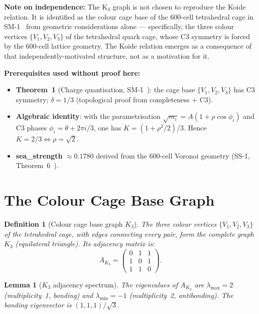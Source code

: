 \documentclass[11pt]{article}
\newtheorem{lemma}[theorem]{Lemma}
\newtheorem{definition}{Definition}[section]
\begin{document}
\textbf{Note on independence:} The K$_3$ graph is not chosen to reproduce
the Koide relation.  It is identified as the colour cage base of the
600-cell tetrahedral cage in SM-1~\cite{abshier2026sm1} from geometric
considerations alone --- specifically, the three colour vertices
$\{V_1,V_2,V_3\}$ of the tetrahedral quark cage, whose C3 symmetry is
forced by the 600-cell lattice geometry.  The Koide relation emerges
as a consequence of that independently-motivated structure, not as a
motivation for it.

\textbf{Prerequisites used without proof here:}
\begin{itemize}
\item \textbf{Theorem~1} (Charge quantisation, SM-1~\cite{abshier2026sm1}):
  the cage base $\{V_1,V_2,V_3\}$ has C3 symmetry; $\delta = 1/3$
  (topological proof from completeness $+$ C3).
\item \textbf{Algebraic identity}: with the parametrisation
  $\sqrt{m_i} = A(1+\rho\cos\phi_i)$ and C3 phases $\phi_i = \theta+2\pi i/3$,
  one has $K = (1+\rho^2/2)/3$.  Hence $K = 2/3 \Leftrightarrow \rho = \sqrt{2}$.
\item \textbf{sea\_strength} $\approx 0.1780$ derived from the
  600-cell Voronoi geometry (SS-1, Theorem~6~\cite{abshier2026ss1}).
\end{itemize}

\section{The Colour Cage Base Graph}

\begin{definition}[Colour cage base graph $K_3$]
The three colour vertices $\{V_1,V_2,V_3\}$ of the tetrahedral cage,
with edges connecting every pair, form the complete graph $K_3$
(equilateral triangle).  Its adjacency matrix is:
\[
A_{K_3} = \begin{pmatrix}0&1&1\\1&0&1\\1&1&0\end{pmatrix}.
\]
\end{definition}

\begin{lemma}[$K_3$ adjacency spectrum]
\label{lem:K3spec}
The eigenvalues of $A_{K_3}$ are
$\lambda_{\max} = 2$ (multiplicity~1, bonding) and
$\lambda_{\min} = -1$ (multiplicity~2, antibonding).
The bonding eigenvector is $(1,1,1)/\sqrt{3}$.
\end{lemma}
\end{document}
